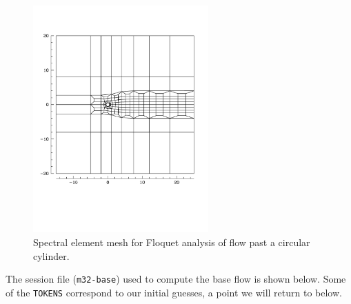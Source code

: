 \documentclass[11pt,a4paper]{report}
\begin{document}
\begin{figure}
\begin{center}
\includegraphics[width=0.6\textwidth]{m32_2D_mesh}
\end{center}
\caption{Spectral element mesh for Floquet analysis of flow past a
  circular cylinder.}
\label{fig.cylinder}
\end{figure}

The session file (\verb+m32-base+) used to compute the base flow is
shown below.  Some of the \verb+TOKENS+ correspond to our initial
guesses, a point we will return to below.
\end{document}
